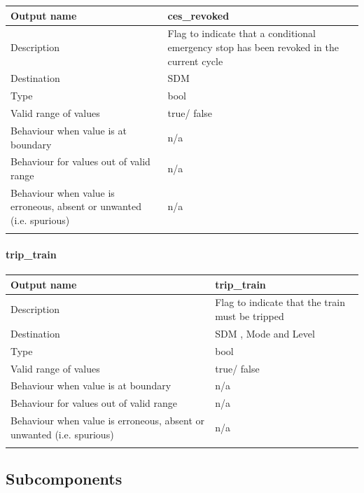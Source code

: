 \begin{longtable}{p{}p{}}
\toprule
Output name				& ces\_revoked \\
\midrule
Description				& Flag to indicate that a conditional emergency stop has been revoked in the current cycle \\
\midrule
Destination				& SDM  \\ 
\midrule
Type					& bool\\


\midrule
Valid range of values	& true/ false \\
\midrule
Behaviour when value is at boundary	& n/a  \\
\midrule
Behaviour for values out of valid range	& n/a  \\
\midrule
Behaviour when value is erroneous, absent or unwanted (i.e. spurious) & n/a  \\
\\
\bottomrule
\end{longtable}

\paragraph{trip\_train}

\begin{longtable}{p{}p{}}
\toprule
Output name				& trip\_train \\
\midrule
Description				& Flag to indicate that the train must be tripped \\
\midrule
Destination				& SDM , Mode and Level\\ 
\midrule
Type					& bool\\


\midrule
Valid range of values	& true/ false \\
\midrule
Behaviour when value is at boundary	& n/a  \\
\midrule
Behaviour for values out of valid range	& n/a  \\
\midrule
Behaviour when value is erroneous, absent or unwanted (i.e. spurious) & n/a  \\
\\
\bottomrule
\end{longtable}


\subsection{Subcomponents}\label{s:manage_track_data_subcomponents}

